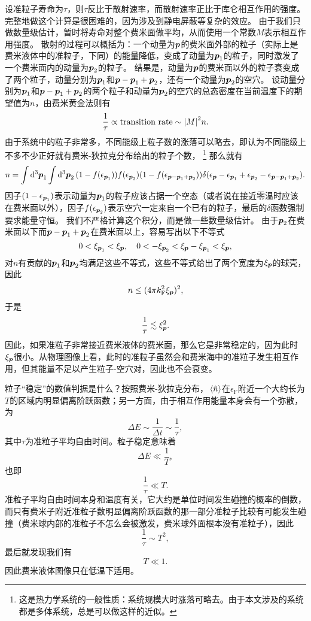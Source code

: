 \documentclass[hyperref, UTF8, a4paper]{ctexart}
\begin{document}
设准粒子寿命为$\tau$，则$\tau$反比于散射速率，而散射速率正比于库仑相互作用的强度。完整地做这个计算是很困难的，因为涉及到静电屏蔽等复杂的效应。
由于我们只做数量级估计，暂时将寿命对整个费米面做平均，从而使用一个常数$M$表示相互作用强度。
散射的过程可以概括为：一个动量为$\vb*{p}$的费米面外部的粒子（实际上是费米液体中的准粒子，下同）的能量降低，变成了动量为$\vb*{p}_1$的粒子，同时激发了一个费米面内的动量为$\vb*{p}_2$的粒子。
结果是，动量为$\vb*{p}$的费米面以外的粒子衰变成了两个粒子，动量分别为$\vb*{p}_1$和$\vb*{p} - \vb*{p}_1 + \vb*{p}_2$，还有一个动量为$\vb*{p}_2$的空穴。
设动量分别为$\vb*{p}_1$和$\vb*{p} - \vb*{p}_1 + \vb*{p}_2$的两个粒子和动量为$\vb*{p}_2$的空穴的总态密度在当前温度下的期望值为$n$，由费米黄金法则有
\[
    \frac{1}{\tau} \propto \text{transition rate} \sim \abs{M}^2 n.
\]
由于系统中的粒子非常多，不同能级上粒子数的涨落可以略去，即认为不同能级上不多不少正好就有费米-狄拉克分布给出的粒子个数，%
\footnote{这是热力学系统的一般性质：系统规模大时涨落可略去。由于本文涉及的系统都是多体系统，总是可以做这样的近似。}%
那么就有
\[
    n = \int \dd[3]{\vb*{p}_1} \int \dd[3]{\vb*{p}_2} (1 - f(\epsilon_{\vb*{p}_1})) f(\epsilon_{\vb*{p}_2}) (1 - f(\epsilon_{\vb*{p} - \vb*{p}_1 + \vb*{p}_2})) \delta(\epsilon_{\vb*{p}} - \epsilon_{\vb*{p}_1} + \epsilon_{\vb*{p}_2} - \epsilon_{\vb*{p} - \vb*{p}_1 + \vb*{p}_2}).
\]
因子$(1-\epsilon_{\vb*{p}_1})$表示动量为$\vb*{p}_1$的粒子应该占据一个空态（或者说在接近零温时应该在费米面以外），因子$f(\epsilon_{\vb*{p}_2})$表示空穴一定来自一个已有的粒子，最后的$\delta$函数强制要求能量守恒。
我们不严格计算这个积分，而是做一些数量级估计。
由于$\vb*{p}_2$在费米面以下而$\vb*{p}- \vb*{p}_1 + \vb*{p}_2$在费米面以上，容易写出以下不等式
\[
    0 < \xi_{\vb*{p}_1} < \xi_{\vb*{p}}, \quad 0 < - \xi_{\vb*{p}_2} < \xi_{\vb*{p}} - \xi_{\vb*{p}_1} < \xi_{\vb*{p}},
\]
对$n$有贡献的$\vb*{p}_1$和$\vb*{p}_2$均满足这些不等式，这些不等式给出了两个宽度为$\xi_{\vb*{p}}$的球壳，因此
\[
    n \leq (4 \pi k_\text{F}^2 \xi_{\vb*{p}})^2,
\]
于是
\begin{equation}
    \frac{1}{\tau} \lesssim \xi_{\vb*{p}}^2.
\end{equation}
因此，如果准粒子非常接近费米液体的费米面，那么它是非常稳定的，因为此时$\xi_{\vb*{p}}$很小。从物理图像上看，此时的准粒子虽然会和费米海中的准粒子发生相互作用，但其能量不足以产生粒子-空穴对，因此也不会衰变。

粒子“稳定”的数值判据是什么？按照费米-狄拉克分布，$\expval*{\hat{n}}$在$\epsilon_\text{F}$附近一个大约长为$T$的区域内明显偏离阶跃函数；另一方面，由于相互作用能量本身会有一个弥散，为
\[
    \Delta E \sim \frac{1}{\Delta t} \sim \frac{1}{\tau},
\]
其中$\tau$为准粒子平均自由时间。粒子稳定意味着
\[
    \Delta E \ll \frac{1}{T},
\]
也即
\[
    \frac{1}{\tau} \ll T.
\]
准粒子平均自由时间本身和温度有关，它大约是单位时间发生碰撞的概率的倒数，而只有费米子附近准粒子数明显偏离阶跃函数的那一部分准粒子比较有可能发生碰撞（费米球内部的准粒子不怎么会被激发，费米球外面根本没有准粒子），因此
\[
    \frac{1}{\tau} \sim T^2,
\]
最后就发现我们有
\[
    T \ll 1.
\]
因此费米液体图像只在低温下适用。
\end{document}

